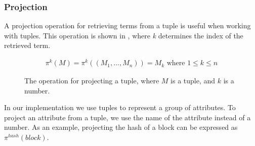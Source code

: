 \subsubsection{Projection}
A projection operation for retrieving terms from a tuple is useful when working with tuples. This operation is shown in , where \textit{k} determines the index of the retrieved term.
\begin{figure}[h]
    \begin{align*}
        \pi^k(M)=\pi^k((M_1,..., M_n))=M_k \text{ where } 1\leq k \leq n
    \end{align*}
    \caption{The operation for projecting a tuple, where $M$ is a tuple, and $k$ is a number.}
\label{tupleop}
\end{figure}

In our implementation we use tuples to represent a group of attributes. To project an attribute from a tuple, we use the name of the attribute instead of a number. As an example, projecting the hash of a block can be expressed as $\pi^{hash}(block)$.
\FloatBarrier
